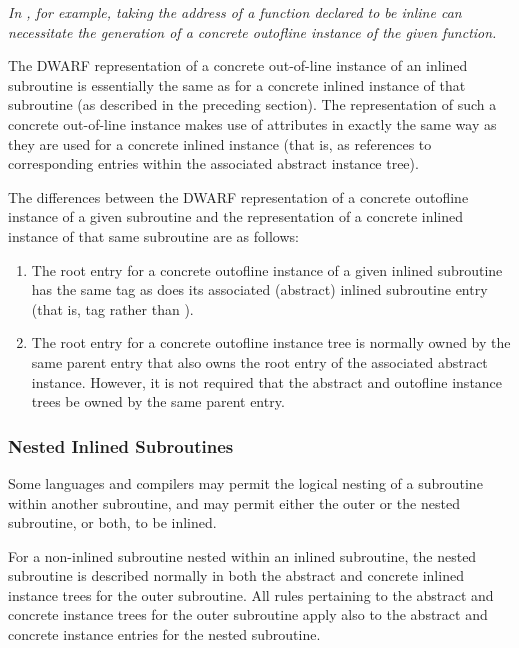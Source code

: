 \textit{In , for example,
taking the address of a function declared
to be inline can necessitate the generation of a concrete
out\dash of\dash line instance of the given function.}

The DWARF representation of a concrete out-of-line instance
of an inlined subroutine is essentially the same as for a
concrete inlined instance of that subroutine (as described in
the preceding section). The representation of such a concrete
out-of-line
instance
\hypertarget{chap:DWATabstractoriginoutoflineinstance}{}
makes use of
\DWATabstractoriginDEFN{}
attributes in exactly the same way as they are used for
a concrete inlined instance (that is, as references to
corresponding entries within the associated abstract instance
tree).

The differences between the DWARF representation of a
concrete out\dash of\dash line instance of a given subroutine and the
representation of a concrete inlined instance of that same
subroutine are as follows:
\begin{enumerate}[1. ]
\item  The root entry for a concrete out\dash of\dash line instance
of a given inlined subroutine has the same tag as does its
associated (abstract) inlined subroutine entry (that is, tag
\DWTAGsubprogram{} rather than \DWTAGinlinedsubroutine).

\item The root entry for a concrete out\dash of\dash line instance tree
is normally owned by the same parent entry that also owns
the root entry of the associated abstract instance. However,
it is not required that the abstract and out\dash of\dash line instance
trees be owned by the same parent entry.

\end{enumerate}

\subsubsection{Nested Inlined Subroutines}
\label{nestedinlinedsubroutines}
Some languages and compilers may permit the logical nesting of
a subroutine within another subroutine, and may permit either
the outer or the nested subroutine, or both, to be inlined.

For a non-inlined subroutine nested within an inlined
subroutine, the nested subroutine is described normally in
both the abstract and concrete inlined instance trees for
the outer subroutine. All rules pertaining to the abstract
and concrete instance trees for the outer subroutine apply
also to the abstract and concrete instance entries for the
nested subroutine.

